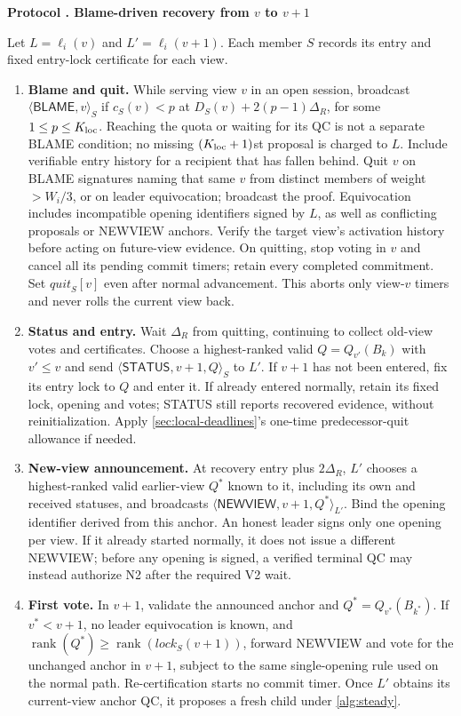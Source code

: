 \documentclass[11pt,a4paper,onecolumn]{article}
\newcommand{\rank}{\operatorname{rank}}
\newcommand{\Tag}[1]{\ensuremath{\mathsf{#1}}}
\newcommand{\changed}[1]{{\color{red}#1}}
\newcounter{protocol}
\newenvironment{protocol}[2]{\refstepcounter{protocol}\label{#1}
\begin{mdframed}[nobreak=true,linewidth=.6pt,skipabove=9pt,skipbelow=9pt,
innertopmargin=7pt,innerbottommargin=7pt]\small
\noindent\textbf{Protocol \theprotocol. #2}\par\smallskip}{\end{mdframed}}
\begin{document}
\begin{protocol}{alg:change}{\changed{Blame-driven recovery from $v$ to $v+1$}}
Let $L=\ell_i(v)$ and $L'=\ell_i(v+1)$. Each member $S$ records its entry
and fixed entry-lock certificate for each view.
\begin{enumerate}[label=\textbf{V\arabic*.},itemsep=4pt]
\item \textbf{Blame and quit.}
\changed{While serving view $v$ in an open session, broadcast
$\langle\Tag{BLAME},v\rangle_S$ if $c_S(v)<p$ at $D_S(v)+2(p-1)\Delta_R$, for some
$1\leq p\leq K_{\rm loc}$. Reaching the quota or waiting for its QC is
not a separate BLAME condition; no missing
$(K_{\rm loc}+1)$st proposal is charged to $L$. Include verifiable entry
history for a recipient that has fallen behind.}
Quit $v$ on BLAME signatures naming \changed{that same $v$} from distinct
members of weight $>W_i/3$, or on leader equivocation; broadcast the proof.
\changed{Equivocation includes incompatible opening identifiers signed by
$L$, as well as conflicting proposals or NEWVIEW anchors. Verify the target
view's activation history before acting on future-view evidence.}
On quitting, stop voting in $v$ and cancel all its pending commit timers;
retain every completed commitment.
\changed{Set $\mathit{quit}_S[v]$ even after normal advancement. This aborts
only view-$v$ timers and never rolls the current view back.}
\item \textbf{Status and entry.} Wait $\Delta_R$ from quitting, continuing
to collect old-view votes and certificates. Choose a highest-ranked valid
$Q=Q_{v'}(B_k)$ with $v'\leq v$ and send
$\langle\Tag{STATUS},v+1,Q\rangle_S$ to $L'$.
\changed{If $v+1$ has not been entered, fix its entry lock to $Q$ and enter
it. If already entered normally, retain its fixed lock, opening and votes;
STATUS still reports recovered evidence, without reinitialization. Apply
\cref{sec:local-deadlines}'s one-time predecessor-quit allowance if needed.}
\item \textbf{New-view announcement.} At recovery entry plus $2\Delta_R$,
$L'$ chooses a highest-ranked valid earlier-view $Q^*$ known to it, including
its own and received statuses, and broadcasts
$\langle\Tag{NEWVIEW},v+1,Q^*\rangle_{L'}$.
\changed{Bind the opening identifier derived from this anchor. An honest
leader signs only one opening per view. If it already started normally,
it does not issue a different NEWVIEW; before any opening is signed, a
verified terminal QC may instead authorize N2 after the required V2 wait.}
\item \textbf{First vote.} In $v+1$, validate the announced anchor and
$Q^*=Q_{v^*}(B_{k^*})$. If $v^*<v+1$, no leader equivocation is known,
and $\rank(Q^*)\geq\rank(\mathit{lock}_S(v+1))$, forward NEWVIEW and vote
for the unchanged anchor in $v+1$,
\changed{subject to the same single-opening rule used on the normal path}.
Re-certification starts no commit timer. Once $L'$ obtains its current-view
anchor QC, it proposes a fresh child under \cref{alg:steady}.
\end{enumerate}
\end{protocol}
\end{document}
